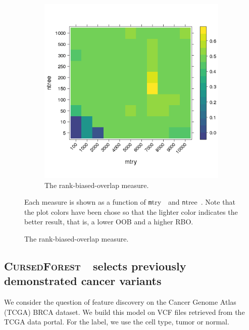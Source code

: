 \documentclass[10pt,letterpaper]{article}
\newcommand{\cursedforest}{\textsc{CursedForest}\ }
\newcommand{\mtry}{{\texttt mtry\ }}
\newcommand{\ntree}{{\texttt ntree\ }}
\begin{document}
\begin{figure}[tbhp]
\begin{adjustwidth}{-1.00in}{0in}
\begin{subfigure}[b]{0.5\linewidth}
    \end{subfigure} 
    \begin{subfigure}[b]{0.5\linewidth}
      \centering
      \includegraphics[totalheight=8cm]{./figs/rbo.png}
      \caption{The  rank-biased-overlap measure.} 
      \label{figure:rbo-prod.png} 
      \vspace{4ex}
    \end{subfigure} 
    \begin{flushleft} 
      Each measure is shown
      as a function of \mtry\ and \ntree. Note that the plot colors have been chose so that the lighter color indicates
      the better result, that is, a lower OOB and a higher RBO.
    \end{flushleft}
  \end{adjustwidth}
\end{figure}

\subsection{\cursedforest\ selects previously demonstrated cancer variants}
We consider the question of feature discovery on the Cancer Genome Atlas (TCGA) BRCA dataset.  We build this model on
VCF files retrieved from the TCGA data portal.  For the label, we use the cell type, tumor or normal.
\end{document}
